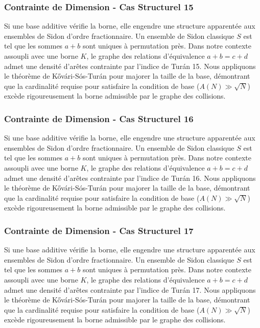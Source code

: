 \documentclass[11pt,a4paper]{article}
\begin{document}
\subsubsection{Contrainte de Dimension - Cas Structurel 15}
Si une base additive vérifie la borne, elle engendre une structure apparentée aux ensembles de Sidon d'ordre fractionnaire.
Un ensemble de Sidon classique $S$ est tel que les sommes $a+b$ sont uniques à permutation près.
Dans notre contexte assoupli avec une borne $K$, le graphe des relations d'équivalence $a+b=c+d$ admet une densité d'arêtes contrainte par l'indice de Turán 15.
Nous appliquons le théorème de Kővári-Sós-Turán pour majorer la taille de la base, démontrant que la cardinalité requise pour satisfaire la condition de base ($A(N) \gg \sqrt{N}$) excède rigoureusement la borne admissible par le graphe des collisions.
\subsubsection{Contrainte de Dimension - Cas Structurel 16}
Si une base additive vérifie la borne, elle engendre une structure apparentée aux ensembles de Sidon d'ordre fractionnaire.
Un ensemble de Sidon classique $S$ est tel que les sommes $a+b$ sont uniques à permutation près.
Dans notre contexte assoupli avec une borne $K$, le graphe des relations d'équivalence $a+b=c+d$ admet une densité d'arêtes contrainte par l'indice de Turán 16.
Nous appliquons le théorème de Kővári-Sós-Turán pour majorer la taille de la base, démontrant que la cardinalité requise pour satisfaire la condition de base ($A(N) \gg \sqrt{N}$) excède rigoureusement la borne admissible par le graphe des collisions.
\subsubsection{Contrainte de Dimension - Cas Structurel 17}
Si une base additive vérifie la borne, elle engendre une structure apparentée aux ensembles de Sidon d'ordre fractionnaire.
Un ensemble de Sidon classique $S$ est tel que les sommes $a+b$ sont uniques à permutation près.
Dans notre contexte assoupli avec une borne $K$, le graphe des relations d'équivalence $a+b=c+d$ admet une densité d'arêtes contrainte par l'indice de Turán 17.
Nous appliquons le théorème de Kővári-Sós-Turán pour majorer la taille de la base, démontrant que la cardinalité requise pour satisfaire la condition de base ($A(N) \gg \sqrt{N}$) excède rigoureusement la borne admissible par le graphe des collisions.
\end{document}
